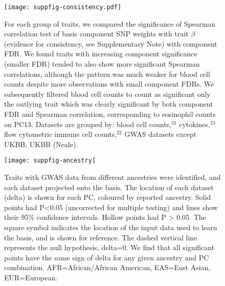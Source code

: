 \documentclass[11pt]{article}
\begin{document}
 \begin{figure}
  \centering
  \texttt{[image: suppfig-consistency.pdf]}
  \caption{For each group of traits, we compared the significance of Spearman correlation test of basis component SNP weights with trait $\beta$ (evidence for consistency, see Supplementary Note) with component FDR. We found traits with increasing component significance (smaller FDR) tended to also show more significant Spearman correlations, although the pattern was much weaker for blood cell counts despite more observations with small component FDRs.  We subsequently filtered blood cell counts to count as significant only the outlying trait which was clearly significant by both component FDR and Spearman correlation, corresponding to eosinophil counts on PC13. Datasets are grouped by: blood cell counts,$^{21}$ cytokines,$^{23}$ flow cytometric immune cell counts,$^{22}$ GWAS datasets except UKBB, UKBB (Neale).}
  \label{sfig:2}
\end{figure}

\begin{figure}
  \centering
  \texttt{[image: suppfig-ancestry]}
  \caption{Traits with GWAS data from different ancestries were identified, and each dataset projected onto the basis. The location of each dataset (delta) is shown for each PC, coloured by reported ancestry.  Solid points had P<0.05 (uncorrected for multiple testing) and lines show their 95\% confidence intervals. Hollow points had P > 0.05.  The square symbol indicates the location of the input data used to learn the basis, and is shown for reference. The dashed vertical line represents the null hypothesis, delta=0. We find that all significant points have the same sign of delta for any given ancestry and PC combination. AFR=African/African American, EAS=East Asian, EUR=European.}
\end{figure}
\end{document}
